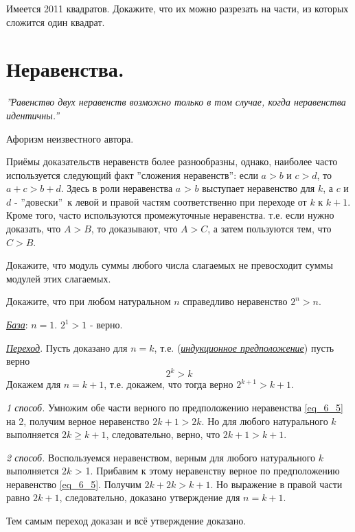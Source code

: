 \begin{thm}
    Имеется 2011 квадратов. Докажите, что их можно разрезать на части, из которых сложится один квадрат.
\end{thm}

\section{Неравенства.}
\epigraph{\textit{''Равенство двух неравенств возможно только в том случае, когда неравенства идентичны.''}}{Афоризм неизвестного автора.}

Приёмы доказательств неравенств более разнообразны, однако, наиболее часто используется следующий факт ''сложения неравенств'': если $a>b$ и $c > d$, то $a + c > b + d$. Здесь в роли неравенства $a$ > $b$ выступает неравенство для $k$, а $c$ и $d$ - ''довески''~к левой и правой частям соответственно при переходе от $k$ к $k + 1$. Кроме того, часто используются промежуточные неравенства. т.е. если нужно доказать, что $A>B$, то доказывают, что $A>C$, а затем пользуются тем, что $C>B$.

\begin{thm}
Докажите, что модуль суммы любого числа слагаемых не превосходит суммы модулей этих слагаемых.
\end{thm}

\begin{thm}
Докажите, что при любом натуральном $n$ справедливо неравенство $2^n > n$.


\end{thm}

\begin{prf}
\par
\textit{\underline{База}}: $n = 1$. $2^1 > 1$ - верно.
\par
\textit{\underline{Переход}}. Пусть доказано для $n = k$, т.е. (\textit{\underline{индукционное предположение}}) пусть верно \begin{equation} \label{eq_6_5}
    2^k > k
\end{equation} 
Докажем для $n = k + 1$, т.е. докажем, что тогда верно $2^{k+1} > k + 1$.
\par
\textit{1 способ.} Умножим обе части верного по предположению неравенства \ref{eq_6_5} на 2, получим верное неравенство $2k+1 > 2k$. Но для любого натурального $k$ выполняется $2k \geq k + 1$, следовательно, верно, что  $2k + 1 > k + 1$.
\par
\textit{2 способ.} Воспользуемся неравенством, верным для любого натурального $k$ выполняется $2k$ > 1. Прибавим к этому неравенству верное по предположению неравенство \ref{eq_6_5}. Получим $2k + 2k > k + 1$. Но выражение в правой части равно $2k + 1$, следовательно, доказано утверждение для $n = k + 1$.
\par
Тем самым переход доказан и всё утверждение доказано. 
\end{prf}

